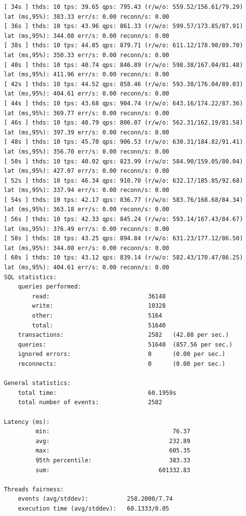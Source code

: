 \documentclass{article}
\begin{document}
\begin{verbatim}
[ 34s ] thds: 10 tps: 39.65 qps: 795.43 (r/w/o: 559.52/156.61/79.29) lat (ms,95%): 383.33 err/s: 0.00 reconn/s: 0.00
[ 36s ] thds: 10 tps: 43.96 qps: 861.33 (r/w/o: 599.57/173.85/87.91) lat (ms,95%): 344.08 err/s: 0.00 reconn/s: 0.00
[ 38s ] thds: 10 tps: 44.85 qps: 879.71 (r/w/o: 611.12/178.90/89.70) lat (ms,95%): 350.33 err/s: 0.00 reconn/s: 0.00
[ 40s ] thds: 10 tps: 40.74 qps: 846.89 (r/w/o: 598.38/167.04/81.48) lat (ms,95%): 411.96 err/s: 0.00 reconn/s: 0.00
[ 42s ] thds: 10 tps: 44.52 qps: 858.46 (r/w/o: 593.38/176.04/89.03) lat (ms,95%): 404.61 err/s: 0.00 reconn/s: 0.00
[ 44s ] thds: 10 tps: 43.68 qps: 904.74 (r/w/o: 643.16/174.22/87.36) lat (ms,95%): 369.77 err/s: 0.00 reconn/s: 0.00
[ 46s ] thds: 10 tps: 40.79 qps: 806.07 (r/w/o: 562.31/162.19/81.58) lat (ms,95%): 397.39 err/s: 0.00 reconn/s: 0.00
[ 48s ] thds: 10 tps: 45.70 qps: 906.53 (r/w/o: 630.31/184.82/91.41) lat (ms,95%): 356.70 err/s: 0.00 reconn/s: 0.00
[ 50s ] thds: 10 tps: 40.02 qps: 823.99 (r/w/o: 584.90/159.05/80.04) lat (ms,95%): 427.07 err/s: 0.00 reconn/s: 0.00
[ 52s ] thds: 10 tps: 46.34 qps: 910.70 (r/w/o: 632.17/185.85/92.68) lat (ms,95%): 337.94 err/s: 0.00 reconn/s: 0.00
[ 54s ] thds: 10 tps: 42.17 qps: 836.77 (r/w/o: 583.76/168.68/84.34) lat (ms,95%): 363.18 err/s: 0.00 reconn/s: 0.00
[ 56s ] thds: 10 tps: 42.33 qps: 845.24 (r/w/o: 593.14/167.43/84.67) lat (ms,95%): 376.49 err/s: 0.00 reconn/s: 0.00
[ 58s ] thds: 10 tps: 43.25 qps: 894.84 (r/w/o: 631.23/177.12/86.50) lat (ms,95%): 344.08 err/s: 0.00 reconn/s: 0.00
[ 60s ] thds: 10 tps: 43.12 qps: 839.14 (r/w/o: 582.43/170.47/86.25) lat (ms,95%): 404.61 err/s: 0.00 reconn/s: 0.00
SQL statistics:
    queries performed:
        read:                            36148
        write:                           10328
        other:                           5164
        total:                           51640
    transactions:                        2582   (42.88 per sec.)
    queries:                             51640  (857.56 per sec.)
    ignored errors:                      0      (0.00 per sec.)
    reconnects:                          0      (0.00 per sec.)

General statistics:
    total time:                          60.1959s
    total number of events:              2582

Latency (ms):
         min:                                   76.37
         avg:                                  232.89
         max:                                  605.35
         95th percentile:                      383.33
         sum:                               601332.83

Threads fairness:
    events (avg/stddev):           258.2000/7.74
    execution time (avg/stddev):   60.1333/0.05
    
\end{verbatim}
\end{document}
